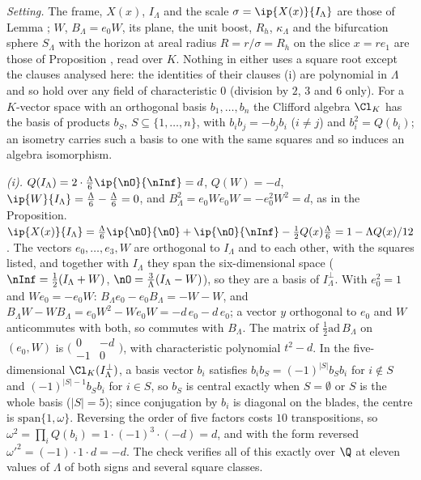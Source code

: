 \emph{Setting.} The frame, $X(x)$, $I_{\Lambda}$ and the scale $\sigma = \ip{X(x)}{I_{\Lambda}}$ are those of Lemma ; $W$, $B_{\Lambda} = e_{0}W$, its plane, the unit boost, $R_{h}$, $\kappa_{\Lambda}$ and the bifurcation sphere $S_{\Lambda}$ with the horizon at areal radius $R = r/\sigma = R_{h}$ on the slice $x = re_{1}$ are those of Proposition , read over $K$. Nothing in either uses a square root except the clauses analysed here: the identities of their clauses (i) are polynomial in $\Lambda$ and so hold over any field of characteristic $0$ (division by $2$, $3$ and $6$ only). For a $K$-vector space with an orthogonal basis $b_{1}, \dots, b_{n}$ the Clifford algebra $\Cl_{K}$ has the basis of products $b_{S}$, $S \subseteq \{1, \dots, n\}$, with $b_{i}b_{j} = -b_{j}b_{i}$ ($i \ne j$) and $b_{i}^{2} = Q(b_{i})$; an isometry carries such a basis to one with the same squares and so induces an algebra isomorphism.

\emph{(i).} $Q(I_{\Lambda}) = 2\cdot\tfrac{\Lambda}{6}\ip{\nO}{\nInf} = d$, $Q(W) = -d$, $\ip{W}{I_{\Lambda}} = \tfrac{\Lambda}{6} - \tfrac{\Lambda}{6} = 0$, and $B_{\Lambda}^{2} = e_{0}We_{0}W = -e_{0}^{2}W^{2} = d$, as in the Proposition. $\ip{X(x)}{I_{\Lambda}} = \tfrac{\Lambda}{6}\ip{\nO}{\nO} + \ip{\nO}{\nInf} - \tfrac12 Q(x)\tfrac{\Lambda}{6} = 1 - \Lambda Q(x)/12$. The vectors $e_{0}, \dots, e_{3}, W$ are orthogonal to $I_{\Lambda}$ and to each other, with the squares listed, and together with $I_{\Lambda}$ they span the six-dimensional space ($\nInf = \tfrac12(I_{\Lambda} + W)$, $\nO = \tfrac{3}{\Lambda}(I_{\Lambda} - W)$), so they are a basis of $I_{\Lambda}^{\perp}$. With $e_{0}^{2} = 1$ and $We_{0} = -e_{0}W$: $B_{\Lambda}e_{0} - e_{0}B_{\Lambda} = -W - W$, and $B_{\Lambda}W - WB_{\Lambda} = e_{0}W^{2} - We_{0}W = -d\,e_{0} - d\,e_{0}$; a vector $y$ orthogonal to $e_{0}$ and $W$ anticommutes with both, so commutes with $B_{\Lambda}$. The matrix of $\tfrac12\mathrm{ad}\,B_{\Lambda}$ on $(e_{0}, W)$ is $\bigl(\begin{smallmatrix}0 & -d\\ -1 & 0\end{smallmatrix}\bigr)$, with characteristic polynomial $t^{2} - d$. In the five-dimensional $\Cl_{K}(I_{\Lambda}^{\perp})$, a basis vector $b_{i}$ satisfies $b_{i}b_{S} = (-1)^{|S|}b_{S}b_{i}$ for $i \notin S$ and $(-1)^{|S|-1}b_{S}b_{i}$ for $i \in S$, so $b_{S}$ is central exactly when $S = \emptyset$ or $S$ is the whole basis ($|S| = 5$); since conjugation by $b_{i}$ is diagonal on the blades, the centre is $\mathrm{span}\{1, \omega\}$. Reversing the order of five factors costs $10$ transpositions, so $\omega^{2} = \prod_{i}Q(b_{i}) = 1\cdot(-1)^{3}\cdot(-d) = d$, and with the form reversed $\omega'^{2} = (-1)\cdot 1\cdot d = -d$. The check verifies all of this exactly over $\Q$ at eleven values of $\Lambda$ of both signs and several square classes.

